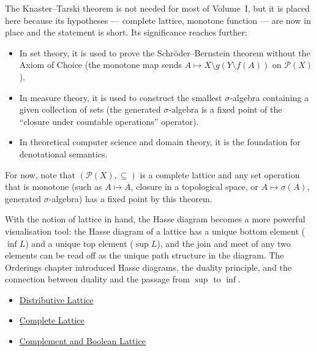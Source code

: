 \begin{remark*}[Exposition]
The Knaster--Tarski theorem is not needed for most of Volume~I, but it is
placed here because its hypotheses --- complete lattice, monotone function ---
are now in place and the statement is short.  Its significance reaches
further:
\begin{itemize}
  \item In set theory, it is used to prove the Schr\"{o}der--Bernstein theorem
        without the Axiom of Choice (the monotone map sends $A \mapsto
        X \setminus g(Y \setminus f(A))$ on $\mathcal{P}(X)$).
  \item In measure theory, it is used to construct the smallest
        $\sigma$-algebra containing a given collection of sets (the
        generated $\sigma$-algebra is a fixed point of the ``closure
        under countable operations'' operator).
  \item In theoretical computer science and domain theory, it is the
        foundation for denotational semantics.
\end{itemize}
For now, note that $(\mathcal{P}(X), \subseteq)$ is a complete lattice and
any set operation that is monotone (such as $A \mapsto \overline{A}$, closure
in a topological space, or $A \mapsto \sigma(A)$, generated $\sigma$-algebra)
has a fixed point by this theorem.
\end{remark*}

\begin{remark*}[Exposition]
With the notion of lattice in hand, the Hasse diagram becomes a more powerful
visualisation tool: the Hasse diagram of a lattice has a unique bottom element
($\inf L$) and a unique top element ($\sup L$), and the join and meet of any
two elements can be read off as the unique path structure in the diagram.
The Orderings chapter introduced Hasse diagrams, the duality principle, and
the connection between duality and the passage from $\sup$ to $\inf$.
\end{remark*}

\begin{dependencies}
\begin{itemize}
  \item \hyperref[def:distributive-lattice]{Distributive Lattice}
  \item \hyperref[def:complete-lattice]{Complete Lattice}
  \item \hyperref[def:boolean-lattice]{Complement and Boolean Lattice}
\end{itemize}
\end{dependencies}
